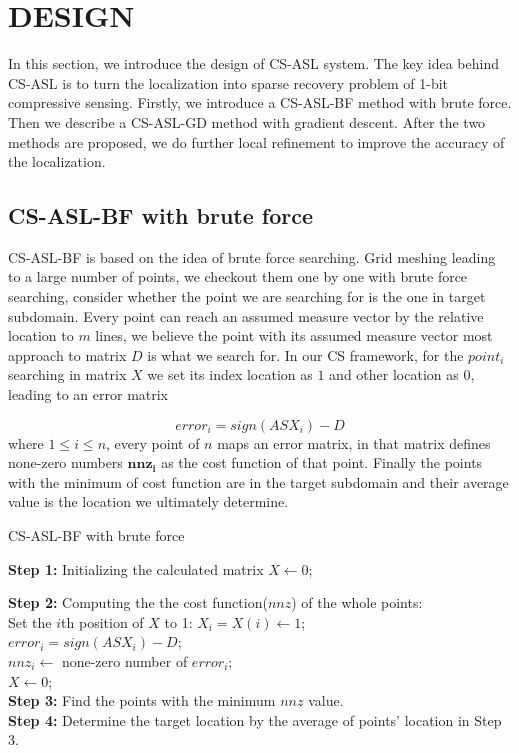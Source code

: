 
\section{DESIGN}

In this section,  we introduce the design of CS-ASL system. The key idea behind CS-ASL is to turn the localization into sparse recovery problem of 1-bit compressive sensing.  
Firstly, we introduce a CS-ASL-BF method with brute force. Then we describe a CS-ASL-GD method with gradient descent. After the two methods are proposed, we do further local refinement to improve the accuracy of the localization.

\subsection{CS-ASL-BF with brute force}
CS-ASL-BF is based on the idea of brute force searching. Grid meshing leading to a large number of points, we checkout them one by one with brute force searching, consider whether the point we are searching for is the one in target subdomain. Every point can reach an assumed measure vector by the relative location to $m$ lines, we believe the point with its assumed measure vector most approach to matrix $D$ is what we search for. In our CS framework, for the ${poin{t_i}}$ searching in matrix $X$ we set its index location as $1$ and other location as $0$, leading to an error matrix

\begin{equation}\label{eq:eps}
error_i=sign(ASX_i)-D
\end{equation}where $1\leq i \leq n$, every point of $n$ maps an error matrix, in that matrix defines none-zero numbers $\bm{nnz{_i}}$ as the cost function of that point. Finally the points with the minimum of cost function are in the target subdomain and their average value is the location we ultimately determine.
\begin{algorithm}
\caption{CS-ASL-BF with brute force}

\textbf{Step 1:} Initializing the calculated matrix $X \leftarrow 0$;

\textbf{Step 2:} Computing the the cost function($nnz$) of the whole points: \\
{
     Set the $i$th position of $X$ to 1: $X_i=X(i) \leftarrow 1$;\\
     $ error_i=sign(ASX_i)-D$;\\
     $nnz_i \leftarrow$ none-zero number of $error_i$;\\
     $X \leftarrow 0$;\\
}
\textbf{Step 3:} Find the points with the minimum $nnz$ value. \\
\textbf{Step 4:} Determine the target location by the average of points' location in Step 3.
\end{algorithm}

